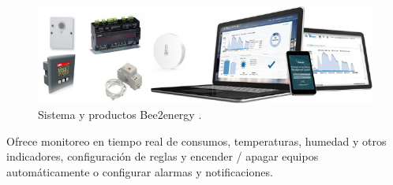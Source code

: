 \begin{itemize}
\begin{figure}[htbp]
	\centering
	\includegraphics[width=.8\textwidth]{./Figures/bee2energy.jpg}
	\caption{Sistema y productos Bee2energy \protect\footnotemark.}
	\label{fig:bee2energy}
\end{figure}


Ofrece monitoreo en tiempo real de consumos, temperaturas, humedad y otros indicadores, configuración de reglas y encender / apagar equipos automáticamente o configurar alarmas y notificaciones.
\end{itemize}
